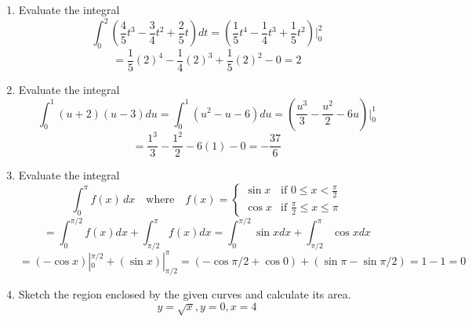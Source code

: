 \documentclass[12pt]{article}
\begin{document}
\begin{enumerate}
\begin{center}
    \end{center}
\setcounter{enumi}{26}
    \item Evaluate the integral
    \[\int_{0}^{2} (\frac{4}{5}t^3 - \frac{3}{4}t^2 + \frac{2}{5}t)dt = (\frac{1}{5}t^4 - \frac{1}{4}t^3 + \frac{1}{5}t^2)|_{0}^{2}\]
    \[ = \frac{1}{5}(2)^4 - \frac{1}{4}(2)^3 + \frac{1}{5}(2)^2 - 0 = 2\]
\setcounter{enumi}{34}
    \item Evaluate the integral
    \[\int_{0}^{1} (u+2)(u-3)du = \int_{0}^{1} (u^2 - u -6) du = (\frac{u^3}{3} - \frac{u^2}{2} - 6u)|^{1}_{0}\]
    \[ = \frac{1^3}{3} - \frac{1^2}{2} - 6(1) - 0 = -\frac{37}{6}\]
\setcounter{enumi}{44}
    \item Evaluate the integral
    \[\int_{0}^{\pi} f(x) \, dx \quad \text{where} \quad f(x) = 
    \begin{cases} 
    \sin x & \text{if } 0 \leq x < \frac{\pi}{2} \\
    \cos x & \text{if } \frac{\pi}{2} \leq x \leq \pi 
    \end{cases}
    \]
    \[ = \int_{0}^{\pi/2} f(x) dx + \int_{\pi/2}^{\pi} f(x) dx = \int_{0}^{\pi/2} \sin x dx + \int_{\pi/2}^{\pi} \cos x dx\]
    \[ = (-\cos x)|^{\pi/2}_{0} + (\sin x)|^{\pi}_{\pi/2} = (-\cos \pi/2 + \cos 0) + (\sin \pi - \sin \pi/2) = 1-1 = 0\]
\setcounter{enumi}{46}
    \item Sketch the region enclosed by the given curves and calculate its area.
    \[y = \sqrt{x}, y = 0, x = 4\]
    \begin{center}
\end{center}
\end{enumerate}
\end{document}
